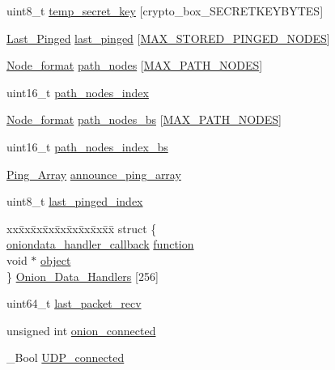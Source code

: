 \begin{DoxyCompactItemize}
\item 
uint8\+\_\+t \hyperlink{struct_onion___client_a6de303feb7b7892cc6a38228554b3e78}{temp\+\_\+secret\+\_\+key} \mbox{[}crypto\+\_\+box\+\_\+\+S\+E\+C\+R\+E\+T\+K\+E\+Y\+B\+Y\+T\+E\+S\mbox{]}
\item 
\hyperlink{struct_last___pinged}{Last\+\_\+\+Pinged} \hyperlink{struct_onion___client_a27015cced65360814a59652b662ef143}{last\+\_\+pinged} \mbox{[}\hyperlink{onion__client_8h_a95b6f5386cd87cd64fcee1c2b7ee2a31}{M\+A\+X\+\_\+\+S\+T\+O\+R\+E\+D\+\_\+\+P\+I\+N\+G\+E\+D\+\_\+\+N\+O\+D\+E\+S}\mbox{]}
\item 
\hyperlink{struct_node__format}{Node\+\_\+format} \hyperlink{struct_onion___client_a1baee18cb7db8dad6b0847fa977b7f16}{path\+\_\+nodes} \mbox{[}\hyperlink{onion__client_8h_ac5f0e3c41d8db63d3af45c98df53d719}{M\+A\+X\+\_\+\+P\+A\+T\+H\+\_\+\+N\+O\+D\+E\+S}\mbox{]}
\item 
uint16\+\_\+t \hyperlink{struct_onion___client_aaeb9402a72e98e04eb5cbc4ff0aac70e}{path\+\_\+nodes\+\_\+index}
\item 
\hyperlink{struct_node__format}{Node\+\_\+format} \hyperlink{struct_onion___client_adc82bddd48395ce29a9d609cd6f39a12}{path\+\_\+nodes\+\_\+bs} \mbox{[}\hyperlink{onion__client_8h_ac5f0e3c41d8db63d3af45c98df53d719}{M\+A\+X\+\_\+\+P\+A\+T\+H\+\_\+\+N\+O\+D\+E\+S}\mbox{]}
\item 
uint16\+\_\+t \hyperlink{struct_onion___client_aa6cb02170665d966dec231613d9d229e}{path\+\_\+nodes\+\_\+index\+\_\+bs}
\item 
\hyperlink{struct_ping___array}{Ping\+\_\+\+Array} \hyperlink{struct_onion___client_a01eafc8a6b041139be5bc6d72c2eafdf}{announce\+\_\+ping\+\_\+array}
\item 
uint8\+\_\+t \hyperlink{struct_onion___client_a6e0a5214a3dffa151dd52dc4c230145b}{last\+\_\+pinged\+\_\+index}
\item 
\begin{tabbing}
xx\=xx\=xx\=xx\=xx\=xx\=xx\=xx\=xx\=\kill
struct \{\\
\>\hyperlink{onion__client_8h_a588c94e2cf9542398b7b8951126a751e}{oniondata\_handler\_callback} \hyperlink{struct_onion___client_a016f61b22111ceb83b172007e8135e73}{function}\\
\>void $\ast$ \hyperlink{struct_onion___client_a077376d12464f945e2414d5499c79b3f}{object}\\
\} \hyperlink{struct_onion___client_a8576150a4360326b1a759d4bfc7c5e59}{Onion\_Data\_Handlers} \mbox{[}256\mbox{]}\\

\end{tabbing}\item 
uint64\+\_\+t \hyperlink{struct_onion___client_ace034948b31137d0ad356f59a3d08af5}{last\+\_\+packet\+\_\+recv}
\item 
unsigned int \hyperlink{struct_onion___client_a1a57f09aaa51824a5069ba1503d52513}{onion\+\_\+connected}
\item 
\+\_\+\+Bool \hyperlink{struct_onion___client_ab561b9f2ae6e811457653ddacc1e7f6c}{U\+D\+P\+\_\+connected}
\end{DoxyCompactItemize}


